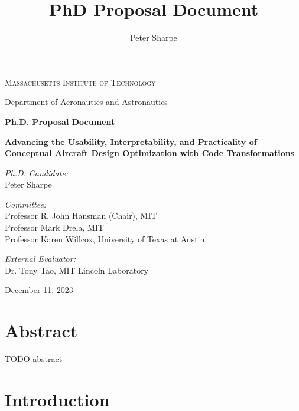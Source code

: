 \documentclass[12pt,vi,oneside]{report}
\title{PhD Proposal Document}
\author{Peter Sharpe}
\begin{document}
    \begin{center}

        \vspace*{1cm}

        \textsc{Massachusetts Institute of Technology}

        Department of Aeronautics and Astronautics

        \vspace{1cm}

        \textbf{Ph.D. Proposal Document}

        \vspace{1cm}

        \textbf{\large Advancing the Usability, Interpretability, and Practicality of Conceptual Aircraft Design Optimization with Code Transformations}
        \vspace{1cm}

        \textit{Ph.D. Candidate:}\\
        Peter Sharpe

        \vspace{1cm}

        \textit{Committee:}\\
        Professor R. John Hansman (Chair), MIT\\
        Professor Mark Drela, MIT\\
        Professor Karen Willcox, University of Texas at Austin\\

        \vspace{1cm}

        \textit{External Evaluator:}\\
        Dr. Tony Tao, MIT Lincoln Laboratory

        \vspace{3cm}

        December 11, 2023

    \end{center}

    \chapter*{Abstract}

    TODO abstract


    \tableofcontents


    \chapter{Introduction}
    \label{sec:intro}
\end{document}

